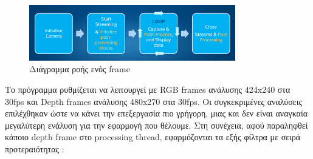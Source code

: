 \begin{figure}[H]
    \centering
    \includegraphics[width=0.8\textwidth]{images/frames_flow.png}
    \caption{Διάγραμμα ροής ενός frame}
    \label{fig:frame-flow}
\end{figure}

Το πρόγραμμα ρυθμίζεται να λειτουργεί με RGB frames ανάλυσης 424x240 στα 30fps και Depth frames ανάλυσης 480x270 στα 30fps. Οι συγκεκριμένες αναλύσεις επιλέχθηκαν ώστε να κάνει την επεξεργασία πιο γρήγορη, μιας και δεν είναι αναγκαία μεγαλύτερη ενάλυση για την εφαρμογή που θέλουμε. Στη συνέχεια, αφού παραληφθεί κάποιο depth frame στο processing thread, εφαρμόζονται τα εξής φίλτρα με σειρά προτεραιότητας \cite{DepthPos51:online}:
